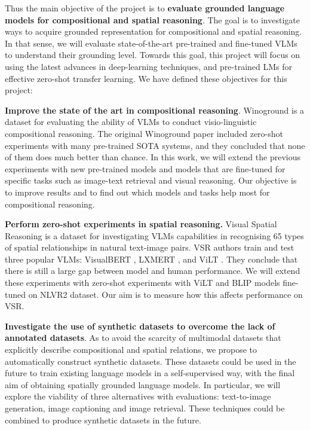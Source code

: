 Thus the main objective of the project is to \textbf{evaluate grounded language models for compositional and spatial reasoning}. The goal is to investigate ways to acquire grounded representation for compositional and spatial reasoning. In that sense, we will evaluate state-of-the-art pre-trained and fine-tuned VLMs to understand their grounding level. Towards this goal, this project will focus on using the latest advances in deep-learning techniques, and pre-trained LMs for effective zero-shot transfer learning. We have defined these objectives for this project:

\textbf{Improve the state of the art in compositional reasoning}. Winoground \cite{thrush2022winoground} is a dataset for evaluating the ability of VLMs to conduct visio-linguistic compositional reasoning. The original Winoground paper included zero-shot experiments with many pre-trained SOTA systems, and they concluded that none of them does much better than chance. In this work, we will extend the previous experiments with new pre-trained models and models that are fine-tuned for specific tasks such as image-text retrieval and visual reasoning. Our objective is to improve results and to find out which models and tasks help most for compositional reasoning.

\textbf{Perform zero-shot experiments in spatial reasoning.} Visual Spatial Reasoning \cite{liu2022visual} is a dataset for investigating VLMs capabilities in recognising 65 types of spatial relationships in natural text-image pairs. VSR authors \cite{liu2022visual} train and test three popular VLMs: VisualBERT \cite{li2019visualbert}, LXMERT \cite{tan2020lxmert}, and
ViLT \cite{kim2021vilt}. They conclude that there is still a large gap between model and human performance. We will extend these experiments with zero-shot experiments with ViLT \cite{kim2021vilt} and BLIP \cite{li2022blip} models fine-tuned on NLVR2 dataset. Our aim is to measure how this affects performance on VSR.

\textbf{Investigate the use of synthetic datasets to overcome the lack of annotated datasets}. As to avoid the scarcity of multimodal datasets that explicitly describe compositional and spatial relations, we propose to automatically construct synthetic datasets. These datasets could be used in the future to train existing language models in a self-supervised way, with the final aim of obtaining spatially grounded language models. In particular, we will explore the viability of three alternatives with evaluations: text-to-image generation, image captioning and image retrieval. These techniques could be combined to produce synthetic datasets in the future.

